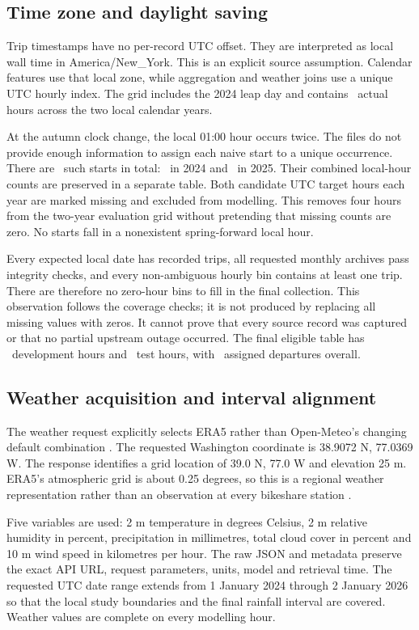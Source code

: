 \documentclass[10pt]{article}
\begin{document}
\subsection{Time zone and daylight saving}
Trip timestamps have no per-record UTC offset. They are interpreted as local wall time in America/New\_York. This is an explicit source assumption. Calendar features use that local zone, while aggregation and weather joins use a unique UTC hourly index. The grid includes the 2024 leap day and contains \NGrid\ actual hours across the two local calendar years.

At the autumn clock change, the local 01:00 hour occurs twice. The files do not provide enough information to assign each naive start to a unique occurrence. There are \NAmbiguous\ such starts in total: \NAmbiguousTwentyFour\ in 2024 and \NAmbiguousTwentyFive\ in 2025. Their combined local-hour counts are preserved in a separate table. Both candidate UTC target hours each year are marked missing and excluded from modelling. This removes four hours from the two-year evaluation grid without pretending that missing counts are zero. No starts fall in a nonexistent spring-forward local hour.

Every expected local date has recorded trips, all requested monthly archives pass integrity checks, and every non-ambiguous hourly bin contains at least one trip. There are therefore no zero-hour bins to fill in the final collection. This observation follows the coverage checks; it is not produced by replacing all missing values with zeros. It cannot prove that every source record was captured or that no partial upstream outage occurred. The final eligible table has \NDev\ development hours and \NTest\ test hours, with \NAssigned\ assigned departures overall.

\subsection{Weather acquisition and interval alignment}
The weather request explicitly selects ERA5 rather than Open-Meteo's changing default combination \citep{openmeteo}. The requested Washington coordinate is 38.9072 N, 77.0369 W. The response identifies a grid location of 39.0 N, 77.0 W and elevation 25 m. ERA5's atmospheric grid is about 0.25 degrees, so this is a regional weather representation rather than an observation at every bikeshare station \citep{copernicus}.

Five variables are used: 2 m temperature in degrees Celsius, 2 m relative humidity in percent, precipitation in millimetres, total cloud cover in percent and 10 m wind speed in kilometres per hour. The raw JSON and metadata preserve the exact API URL, request parameters, units, model and retrieval time. The requested UTC date range extends from 1 January 2024 through 2 January 2026 so that the local study boundaries and the final rainfall interval are covered. Weather values are complete on every modelling hour.
\end{document}
